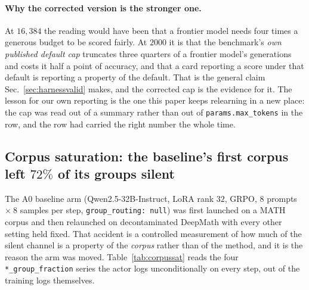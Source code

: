\paragraph{Why the corrected version is the stronger one.} At $16{,}384$ the reading would
have been that a frontier model needs four times a generous budget to be scored fairly. At
$2000$ it is that the benchmark's \emph{own published default cap} truncates three quarters of
a frontier model's generations and costs it half a point of accuracy, and that a card
reporting a score under that default is reporting a property of the default. That is the
general claim Sec.~\ref{sec:harnessvalid} makes, and the corrected cap is the evidence for it.
The lesson for our own reporting is the one this paper keeps relearning in a new place: the
cap was read out of a summary rather than out of \texttt{params.max\_tokens} in the row, and
the row had carried the right number the whole time.

\subsection{Corpus saturation: the baseline's first corpus left $72\%$ of its groups silent}
\label{sec:corpussat}

The A0 baseline arm (Qwen2.5-32B-Instruct, LoRA rank $32$, GRPO, $8$ prompts $\times\ 8$
samples per step, \texttt{group\_routing: null}) was first launched on a MATH corpus and then
relaunched on decontaminated DeepMath with every other setting held fixed. That accident is a
controlled measurement of how much of the silent channel is a property of the \emph{corpus}
rather than of the method, and it is the reason the arm was moved. Table~\ref{tab:corpussat}
reads the four \texttt{*\_group\_fraction} series the actor logs unconditionally on every
step, out of the training logs themselves.

